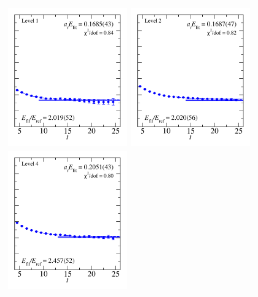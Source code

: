 \begin{figure}
  \includegraphics[width=0.28\textwidth]{figures/spectrum_a1gm/no_tq/fits/fit_1.pdf}
  \includegraphics[width=0.28\textwidth]{figures/spectrum_a1gm/no_tq/fits/fit_2.pdf}\\
  \includegraphics[width=0.28\textwidth]{figures/spectrum_a1gm/no_tq/fits/fit_4.pdf}

\end{figure}
